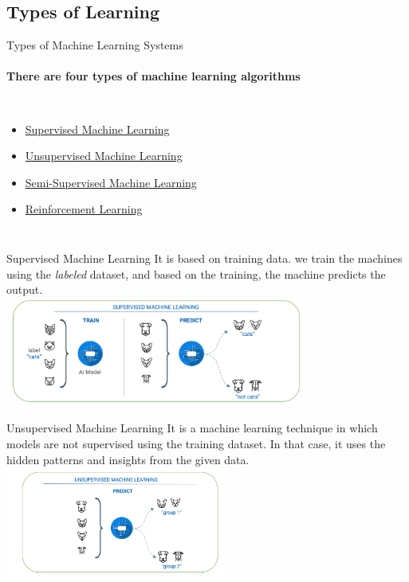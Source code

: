 \documentclass{beamer}
\begin{document}
    \subsection{Types of Learning}
    \begin{frame}[label=lists]{Types of Machine Learning Systems}
      \framesubtitle{There are four types of machine learning algorithms}
      \begin{columns}[onlytextwidth]
          \begin{itemize}
            \item \hyperlink{sml}{Supervised Machine Learning}
            \item \hyperlink{uml}{Unsupervised Machine Learning}
            \item \hyperlink{ssml}{Semi-Supervised Machine Learning}
            \item \hyperlink{rl}{Reinforcement Learning}
            \end{itemize}
      \end{columns}
      
    \end{frame} 
    
    \begin{frame}[label=sml]{Supervised Machine Learning}
      \justifying It is based on training data. we train the machines using the \emph{labeled} dataset, and based on the training, the machine predicts the output. \\
      \vfill
      \centering 
        \includegraphics[height=36mm]{resources/supervised-machine-learning}
    \end{frame}
    
    \begin{frame}[label=uml]{Unsupervised Machine Learning}
      \justifying It is a machine learning technique in which models are not supervised using the training dataset. In that case, it uses the hidden patterns and insights from the given data.
      \vfill
      \centering
      \includegraphics[height=36mm]{resources/unsupervied-machine-learning}
    \end{frame}
    
\end{document}
